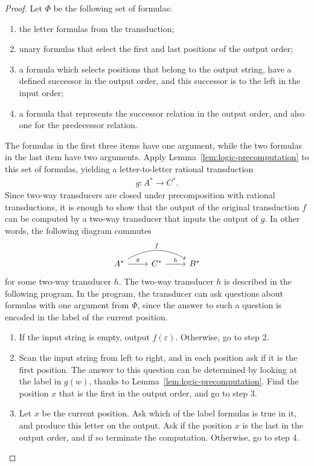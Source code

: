 \begin{proof}
    Let $\Phi$ be the following set of formulas: 
    \begin{enumerate}
        \item the letter formulas from the transduction;
         \item unary formulas that select the first and last positions of the output order;
        \item a formula which selects positions that  belong to the output string, have a defined successor in the output order, and this  successor is to the left in the input order;
          \item a formula that represents the successor relation in the output order, and also one for the predecessor relation.
    \end{enumerate}
    The formulas in the first three items have one argument, while the two formulas in the last item have two arguments. Apply Lemma~\ref{lem:logic-precomputation} to this set of formulas, yielding a letter-to-letter rational transduction  
    \begin{align*}
     g : A^* \to C^*.
    \end{align*}
    Since two-way transducers are closed under precomposition with rational transductions, it is enough to show that the output of the original \mso transduction $f$ can be computed by a two-way transducer that inputs the output of $g$. In other words, the following diagram commutes
    \[
    \begin{tikzcd}
    A^* 
    \ar[r,"g"] 
    \ar[rr,"f",bend left]
    & 
    C^*
    \ar[r,"h"]
    & 
    B^*
    \end{tikzcd}
    \]
    for some two-way transducer $h$. The two-way transducer $h$ is described in the following program. In the program, the transducer can ask questions about formulas with one argument from $\Phi$, since the answer to such a question is encoded in the label of the current position. 
    \begin{enumerate}
        \item If the input string is empty, output $f(\varepsilon)$. Otherwise, go to step 2.
        \item Scan the input string from left to right, and in each position ask if it is the first position. The answer to this question can be determined by looking at the label in $g(w)$, thanks to Lemma~\ref{lem:logic-precomputation}. Find the position $x$ that is the first in the output order, and go to step 3.
        \item Let $x$ be the current position. Ask which of the label formulas is true in it, and produce this letter on the output. Ask if the position $x$ is the last in the output order, and if so terminate the computation. Otherwise, go to step 4.

\end{enumerate}
\end{proof}
